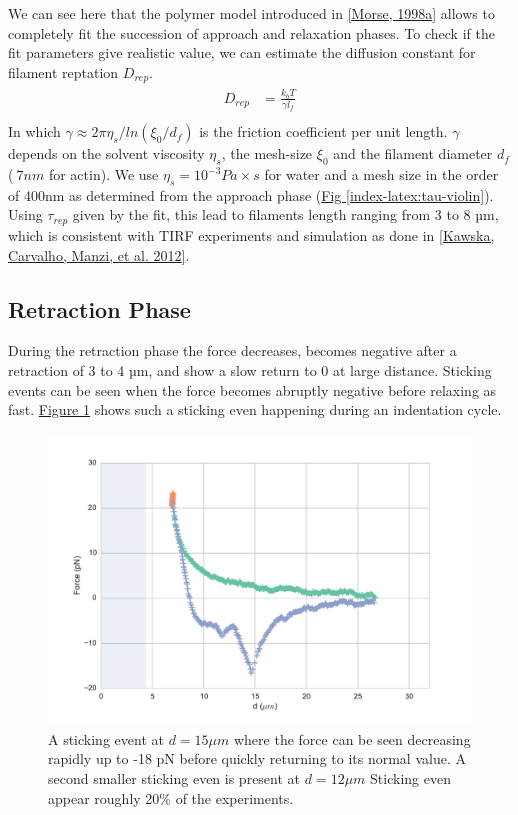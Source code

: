 \documentclass[A4paperpaper,11pt,english]{sphinxmanual}
\begin{document}
We can see here that the polymer model introduced in {\hyperref[index-latex:morse1998a]{{[}Morse,  1998a{]}}} allows
to completely fit the succession of approach and relaxation phases.  To check if
the fit parameters give realistic value, we can estimate the diffusion constant
for filament reptation \(D_{rep}\).
\label{index-latex:equation-eqa3-10}\begin{gather}
\begin{split}D_{rep} &= \frac{k_bT}{\gamma l_f} \\\end{split}\label{index-latex-eqa3-10}
\end{gather}
In which \(\gamma\approx {2\pi\eta_s}/{ln(\xi_0/d_f)}\) is the friction
coefficient per unit length. \(\gamma\) depends on the solvent viscosity
\(\eta_s\), the mesh-size \(\xi_0\) and the filament diameter
\(d_f\) (\(~7nm\) for actin).  We use \(\eta_s=10^{-3} Pa\times s\)
for water and a mesh size in the order of 400nm as determined from the approach phase
(\hyperref[index-latex:tau-violin]{Fig  \ref*{index-latex:tau-violin}}). Using \(\tau_{rep}\) given by the fit, this lead to filaments
length ranging from 3 to 8 µm, which is consistent with TIRF experiments and simulation as done in {\hyperref[index-latex:kawska2012]{{[}Kawska, Carvalho, Manzi,  et al.  2012{]}}}.


\subsection{Retraction Phase}
\label{index-latex:retraction-phase}
During the retraction phase the force decreases, becomes negative after a
retraction of 3 to 4 µm, and show a slow  return to 0 at large distance.
Sticking events can be seen when the force becomes abruptly negative before
relaxing as fast. \hyperref[index-latex:sticking-event]{Figure  \ref*{index-latex:sticking-event}} shows such a sticking even
happening during an indentation cycle.
\begin{figure}[htbp]
\centering
\capstart

\includegraphics[width=0.800\linewidth]{sticking-event.pdf}
\caption{A sticking event at \(d=15\mu{}m\) where the force can be seen decreasing rapidly
up to -18 pN before quickly returning to its normal value. A second smaller
sticking even is present at \(d=12\mu{}m\) Sticking even appear roughly 20\% of
the experiments.}\label{index-latex:sticking-event}\end{figure}
\end{document}
